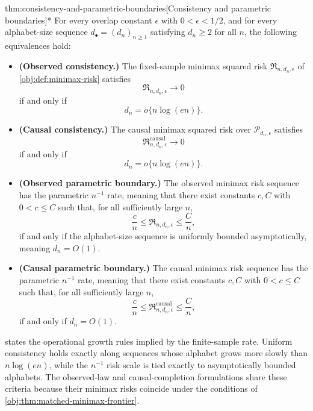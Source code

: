 \begin{theoremv}{thm:consistency-and-parametric-boundaries}[Consistency and parametric boundaries]*
For every overlap constant \(\epsilon\) with \(0<\epsilon<1/2\), and for every alphabet-size sequence \(d_\bullet=(d_n)_{n\ge 1}\) satisfying \(d_n\ge 2\) for all \(n\), the following equivalences hold:
\begin{itemize}
\item \textbf{(Observed consistency.)} The fixed-sample minimax squared risk \(\mathfrak R_{n,d_n,\epsilon}\) of \cref{obj:def:minimax-risk} satisfies
\[
\mathfrak R_{n,d_n,\epsilon}\longrightarrow 0
\]
if and only if
\[
d_n=o\{n\log(en)\}.
\]
\item \textbf{(Causal consistency.)} The causal minimax squared risk over \(\mathcal P_{d_n,\epsilon}\) satisfies
\[
\mathfrak R^{\mathrm{causal}}_{n,d_n,\epsilon}\longrightarrow 0
\]
if and only if
\[
d_n=o\{n\log(en)\}.
\]
\item \textbf{(Observed parametric boundary.)} The observed minimax risk sequence has the parametric \(n^{-1}\) rate, meaning that there exist constants \(c,C\) with \(0<c\le C\) such that, for all sufficiently large \(n\),
\[
\frac{c}{n}\le \mathfrak R_{n,d_n,\epsilon}\le \frac{C}{n},
\]
if and only if the alphabet-size sequence is uniformly bounded asymptotically, meaning \(d_n=O(1)\).
\item \textbf{(Causal parametric boundary.)} The causal minimax risk sequence has the parametric \(n^{-1}\) rate, meaning that there exist constants \(c,C\) with \(0<c\le C\) such that, for all sufficiently large \(n\),
\[
\frac{c}{n}\le \mathfrak R^{\mathrm{causal}}_{n,d_n,\epsilon}\le \frac{C}{n},
\]
if and only if \(d_n=O(1)\).
\end{itemize}
\end{theoremv}

 states the operational growth rules implied by the finite-sample rate. Uniform consistency holds exactly along sequences whose alphabet grows more slowly than \(n\log(en)\), while the \(n^{-1}\) risk scale is tied exactly to asymptotically bounded alphabets. The observed-law and causal-completion formulations share these criteria because their minimax risks coincide under the conditions of \cref{obj:thm:matched-minimax-frontier}.
